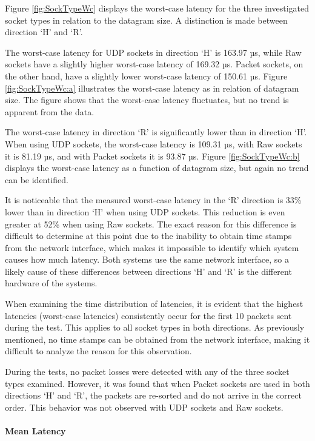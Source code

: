 Figure \ref{fig:SockTypeWc} displays the worst-case latency for the three investigated socket types in relation to the datagram size. A distinction is made between direction `H' and `R'.

The worst-case latency for UDP sockets in direction `H' is 163.97 µs, while Raw sockets have a slightly higher worst-case latency of 169.32 µs. Packet sockets, on the other hand, have a slightly lower worst-case latency of 150.61 µs. Figure \ref{fig:SockTypeWc:a} illustrates the worst-case latency as in relation of datagram size. The figure shows that the worst-case latency fluctuates, but no trend is apparent from the data.

The worst-case latency in direction `R' is significantly lower than in direction `H'. When using UDP sockets, the worst-case latency is 109.31 µs, with Raw sockets it is 81.19 µs, and with Packet sockets it is 93.87 µs. Figure \ref{fig:SockTypeWc:b} displays the worst-case latency as a function of datagram size, but again no trend can be identified.

It is noticeable that the measured worst-case latency in the `R' direction is 33\% lower than in direction `H' when using UDP sockets. This reduction is even greater at 52\% when using Raw sockets. The exact reason for this difference is difficult to determine at this point due to the inability to obtain time stamps from the network interface, which makes it impossible to identify which system causes how much latency. Both systems use the same network interface, so a likely cause of these differences between directions `H' and `R' is the different hardware of the systems.

When examining the time distribution of latencies, it is evident that the highest latencies (worst-case latencies) consistently occur for the first 10 packets sent during the test. This applies to all socket types in both directions. As previously mentioned, no time stamps can be obtained from the network interface, making it difficult to analyze the reason for this observation.

During the tests, no packet losses were detected with any of the three socket types examined. However, it was found that when Packet sockets are used in both directions `H' and `R', the packets are re-sorted and do not arrive in the correct order. This behavior was not observed with UDP sockets and Raw sockets.

\paragraph{Mean Latency}

